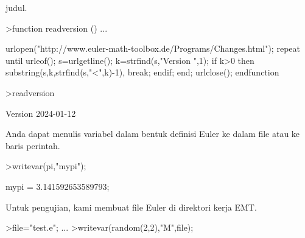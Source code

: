 \documentclass[a4paper,10pt]{article}
\begin{document}
\begin{eulernotebook}
\begin{eulercomment}
\begin{eulercomment}
\begin{eulercomment}
\begin{eulercomment}
\begin{eulercomment}
\begin{eulercomment}
\begin{eulercomment}
\begin{eulercomment}
\begin{eulercomment}
\begin{eulercomment}
\begin{eulercomment}
\begin{eulercomment}
\begin{eulercomment}
\begin{eulercomment}
\begin{eulercomment}
\begin{eulercomment}
\begin{eulercomment}
\begin{eulercomment}
\begin{eulercomment}
\begin{eulercomment}
\begin{eulercomment}
\begin{eulercomment}
\begin{eulercomment}
\begin{eulercomment}
\begin{eulercomment}
\begin{eulercomment}
\begin{eulercomment}
\begin{eulercomment}
\begin{eulercomment}
\begin{eulercomment}
\begin{eulercomment}
\begin{eulercomment}
\begin{eulercomment}
\begin{eulercomment}
\begin{eulercomment}
\begin{eulercomment}
\begin{eulercomment}
\begin{eulercomment}
\begin{eulercomment}
\begin{eulercomment}
\begin{eulercomment}
\begin{eulercomment}
\begin{eulercomment}
\begin{eulercomment}
\begin{eulercomment}
\begin{eulercomment}
\begin{eulercomment}
\begin{eulercomment}
\begin{eulercomment}
\begin{eulercomment}
\begin{eulercomment}
\begin{eulercomment}
\begin{eulercomment}
\begin{eulercomment}
\begin{eulercomment}
\begin{eulercomment}
\begin{eulercomment}
\begin{eulercomment}
\begin{eulercomment}
\begin{eulercomment}
\begin{eulercomment}
\begin{eulercomment}
\begin{eulercomment}
\begin{eulercomment}
\begin{eulercomment}
\begin{eulercomment}
\begin{eulercomment}
\begin{eulercomment}
\begin{eulercomment}
\begin{eulercomment}
\begin{eulercomment}
judul.
\end{eulercomment}
\begin{eulerprompt}
>function readversion () ...
\end{eulerprompt}
\begin{eulerudf}
  urlopen("http://www.euler-math-toolbox.de/Programs/Changes.html");
  repeat
    until urleof();
    s=urlgetline();
    k=strfind(s,"Version ",1);
    if k>0 then substring(s,k,strfind(s,"<",k)-1), break; endif;
  end;
  urlclose();
  endfunction
\end{eulerudf}
\begin{eulerprompt}
>readversion
\end{eulerprompt}
\begin{euleroutput}
  Version 2024-01-12
\end{euleroutput}
\begin{eulercomment}
Anda dapat menulis variabel dalam bentuk definisi Euler ke dalam file
atau ke baris perintah.
\end{eulercomment}
\begin{eulerprompt}
>writevar(pi,"mypi");
\end{eulerprompt}
\begin{euleroutput}
  mypi = 3.141592653589793;
\end{euleroutput}
\begin{eulercomment}
Untuk pengujian, kami membuat file Euler di direktori kerja EMT.
\end{eulercomment}
\begin{eulerprompt}
>file="test.e"; ...
>writevar(random(2,2),"M",file); 
\end{eulerprompt}
\end{eulercomment}
\end{eulercomment}
\end{eulercomment}
\end{eulercomment}
\end{eulercomment}
\end{eulercomment}
\end{eulercomment}
\end{eulercomment}
\end{eulercomment}
\end{eulercomment}
\end{eulercomment}
\end{eulercomment}
\end{eulercomment}
\end{eulercomment}
\end{eulercomment}
\end{eulercomment}
\end{eulercomment}
\end{eulercomment}
\end{eulercomment}
\end{eulercomment}
\end{eulercomment}
\end{eulercomment}
\end{eulercomment}
\end{eulercomment}
\end{eulercomment}
\end{eulercomment}
\end{eulercomment}
\end{eulercomment}
\end{eulercomment}
\end{eulercomment}
\end{eulercomment}
\end{eulercomment}
\end{eulercomment}
\end{eulercomment}
\end{eulercomment}
\end{eulercomment}
\end{eulercomment}
\end{eulercomment}
\end{eulercomment}
\end{eulercomment}
\end{eulercomment}
\end{eulercomment}
\end{eulercomment}
\end{eulercomment}
\end{eulercomment}
\end{eulercomment}
\end{eulercomment}
\end{eulercomment}
\end{eulercomment}
\end{eulercomment}
\end{eulercomment}
\end{eulercomment}
\end{eulercomment}
\end{eulercomment}
\end{eulercomment}
\end{eulercomment}
\end{eulercomment}
\end{eulercomment}
\end{eulercomment}
\end{eulercomment}
\end{eulercomment}
\end{eulercomment}
\end{eulercomment}
\end{eulercomment}
\end{eulercomment}
\end{eulercomment}
\end{eulercomment}
\end{eulercomment}
\end{eulercomment}
\end{eulercomment}
\end{eulernotebook}
\end{document}
